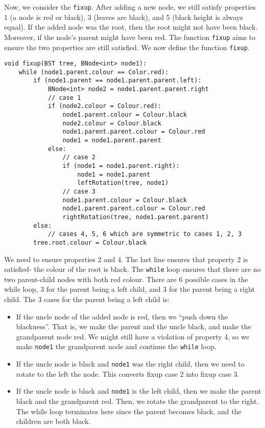 \documentclass[a4paper, openany]{memoir}
\begin{document}
\noindent Now, we consider the \texttt{fixup}. After adding a new node, we still satisfy properties 1 (a node is red or black), 3 (leaves are black), and 5 (black height is always equal). If the added node was the root, then the root might not have been black. Moreover, if the node's parent might have been red. The function \texttt{fixup} aims to ensure the two properties are still satisfied. We now define the function \texttt{fixup}.
\begin{lstlisting}[language=pseudocode]
void fixup(BST tree, BNode<int> node1):
    while (node1.parent.colour == Color.red):
        if (node1.parent == node1.parent.parent.left):
            BNode<int> node2 = node1.parent.parent.right
            // case 1
            if (node2.colour = Colour.red):
                node1.parent.colour = Colour.black
                node2.colour = Colour.black
                node1.parent.parent.colour = Colour.red
                node1 = node1.parent.parent
            else:
                // case 2
                if (node1 = node1.parent.right):
                    node1 = node1.parent
                    leftRotation(tree, node1)
                // case 3
                node1.parent.colour = Colour.black
                node1.parent.parent.colour = Colour.red
                rightRotation(tree, node1.parent.parent)
        else:
            // cases 4, 5, 6 which are symmetric to cases 1, 2, 3
        tree.root.colour = Colour.black
\end{lstlisting}
We need to ensure properties 2 and 4. The last line ensures that property 2 is satisfied- the colour of the root is black. The \texttt{while} loop ensures that there are no two parent-child nodes with both red colour. There are 6 possible cases in the while loop, 3 for the parent being a left child, and 3 for the parent being a right child. The 3 cases for the parent being a left child is:
\begin{itemize}
    \item If the uncle node of the added node is red, then we ``push down the blackness''. That is, we make the parent and the uncle black, and make the grandparent node red. We might still have a violation of property 4, so we make \texttt{node1} the grandparent node and continue the \texttt{while} loop.
    \item If the uncle node is black and \texttt{node1} was the right child, then we need to rotate to the left the node. This converts fixup case 2 into fixup case 3.
    \item If the uncle node is black and \texttt{node1} is the left child, then we make the parent black and the grandparent red. Then, we rotate the grandparent to the right. The while loop terminates here since the parent becomes black, and the children are both black.
\end{itemize}
\end{document}
